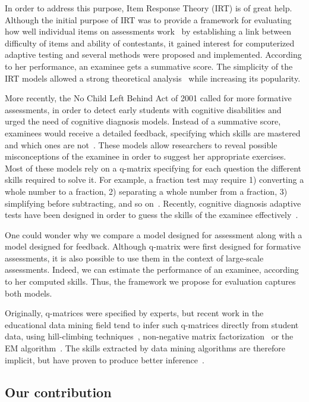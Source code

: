 \documentclass{sig-alternate}
\newcommand\note[1]{\textcolor{blue}{#1}}
\begin{document}
In order to address this purpose, Item Response Theory (IRT) is of great help. Although the initial purpose of IRT was to provide a framework for evaluating how well individual items on assessments work~\citep{Hambleton1991} by establishing a link between difficulty of items and ability of contestants, it gained interest for computerized adaptive testing and several methods were proposed and implemented. According to her performance, an examinee gets a summative score. The simplicity of the IRT models allowed a strong theoretical analysis~\citep{Baker2004} while increasing its popularity.

More recently, the No Child Left Behind Act of 2001 called for more formative assessments, in order to detect early students with cognitive disabilities and urged the need of cognitive diagnosis models. Instead of a summative score, examinees would receive a detailed feedback, specifying which skills are mastered and which ones are not~\citep{Cheng2009}. These models allow researchers to reveal possible misconceptions of the examinee in order to suggest her appropriate exercises. Most of these models rely on a q-matrix specifying for each question the different skills required to solve it. For example, a fraction test may require 1) converting a whole number to a fraction, 2) separating a whole number from a fraction, 3) simplifying before subtracting, and so on~\citep{DeLaTorreDouglas2004}. Recently, cognitive diagnosis adaptive tests have been designed in order to guess the skills of the examinee effectively~\citep{Huebner2010}.

One could wonder why we compare a model designed for assessment along with a model designed for feedback. Although q-matrix were first designed for formative assessments, it is also possible to use them in the context of large-scale assessments. Indeed, we can estimate the performance of an examinee, according to her computed skills. Thus, the framework we propose for evaluation captures both models. %

Originally, q-matrices were specified by experts, but recent work in the educational data mining field tend to infer such q-matrices directly from student data, using hill-climbing techniques~\citep{Barnes2005}, non-negative matrix factorization~\citep{Desmarais2011} or the EM algorithm~\citep{Huebner2010}. The skills extracted by data mining algorithms are therefore implicit, but have proven to produce better inference~\citep{Barnes2003}.

\subsection{Our contribution}
\end{document}
